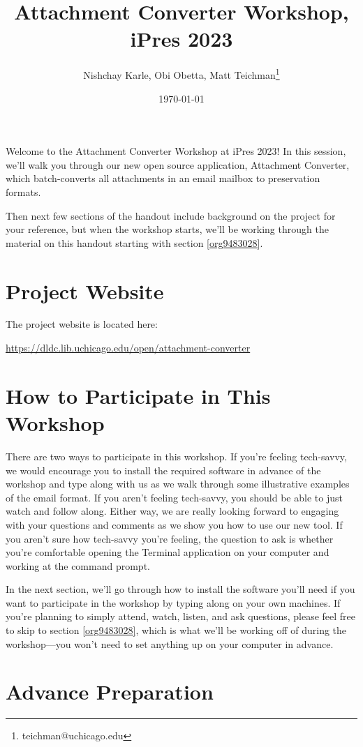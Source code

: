 \documentclass[11pt]{article}
\author{Nishchay Karle, Obi Obetta, Matt Teichman\thanks{teichman@uchicago.edu}}
\date{\today}
\title{Attachment Converter Workshop, iPres 2023}
\begin{document}
\maketitle
Welcome to the Attachment Converter Workshop at iPres 2023!  In this
session, we'll walk you through our new open source application,
Attachment Converter, which batch-converts all attachments in an email
mailbox to preservation formats.

Then next few sections of the handout include background on the
project for your reference, but when the workshop starts, we'll be
working through the material on this handout starting with section
\ref{org9483028}.

\section{Project Website}
\label{sec:org5887b80}

The project website is located here:

\url{https://dldc.lib.uchicago.edu/open/attachment-converter}

\section{How to Participate in This Workshop}
\label{sec:org5386b69}

There are two ways to participate in this workshop.  If you're feeling
tech-savvy, we would encourage you to install the required software in
advance of the workshop and type along with us as we walk through some
illustrative examples of the email format.  If you aren't feeling
tech-savvy, you should be able to just watch and follow along.  Either
way, we are really looking forward to engaging with your questions and
comments as we show you how to use our new tool. If you aren't sure
how tech-savvy you're feeling, the question to ask is whether you're
comfortable opening the Terminal application on your computer and
working at the command prompt.

In the next section, we'll go through how to install the software
you'll need if you want to participate in the workshop by typing along
on your own machines.  If you're planning to simply attend, watch,
listen, and ask questions, please feel free to skip to section
\ref{org9483028}, which is what we'll be working off of during the
workshop---you won't need to set anything up on your computer in
advance.

\section{Advance Preparation \label{orge7e3722}}
\label{sec:orgaab8abb}
\end{document}
